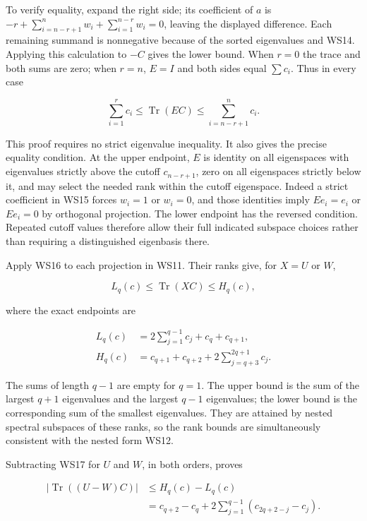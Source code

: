 \documentclass{article}
\begin{document}
To verify equality, expand the right side; its coefficient of \(a\) is \(-r+\sum_{i=n-r+1}^nw_i+\sum_{i=1}^{n-r}w_i=0\), leaving the displayed difference. Each remaining summand is nonnegative because of the sorted eigenvalues and WS14. Applying this calculation to \(-C\) gives the lower bound. When \(r=0\) the trace and both sums are zero; when \(r=n\), \(E=I\) and both sides equal \(\sum c_i\). Thus in every case

\[
\sum_{i=1}^r c_i\le\operatorname{Tr}(EC)
\le\sum_{i=n-r+1}^{n}c_i.
\tag{WS16}
\]

This proof requires no strict eigenvalue inequality. It also gives the precise equality condition. At the upper endpoint, \(E\) is identity on all eigenspaces with eigenvalues strictly above the cutoff \(c_{n-r+1}\), zero on all eigenspaces strictly below it, and may select the needed rank within the cutoff eigenspace. Indeed a strict coefficient in WS15 forces \(w_i=1\) or \(w_i=0\), and those identities imply \(Ee_i=e_i\) or \(Ee_i=0\) by orthogonal projection. The lower endpoint has the reversed condition. Repeated cutoff values therefore allow their full indicated subspace choices rather than requiring a distinguished eigenbasis there.

Apply WS16 to each projection in WS11. Their ranks give, for \(X=U\) or \(W\),

\[
L_q(c)\le\operatorname{Tr}(XC)\le H_q(c),
\tag{WS17}
\]

where the exact endpoints are

\[
\begin{aligned}
L_q(c)&=2\sum_{j=1}^{q-1}c_j+c_q+c_{q+1},\\
H_q(c)&=c_{q+1}+c_{q+2}
       +2\sum_{j=q+3}^{2q+1}c_j.
\end{aligned}
\tag{WS18}
\]

The sums of length \(q-1\) are empty for \(q=1\). The upper bound is the sum of the largest \(q+1\) eigenvalues and the largest \(q-1\) eigenvalues; the lower bound is the corresponding sum of the smallest eigenvalues. They are attained by nested spectral subspaces of these ranks, so the rank bounds are simultaneously consistent with the nested form WS12.

Subtracting WS17 for \(U\) and \(W\), in both orders, proves

\[
\boxed{
\begin{aligned}
\left|\operatorname{Tr}((U-W)C)\right|
&\le H_q(c)-L_q(c)\\
&=c_{q+2}-c_q
 +2\sum_{j=1}^{q-1}(c_{2q+2-j}-c_j).
\end{aligned}}
\tag{WS19}
\]
\end{document}
